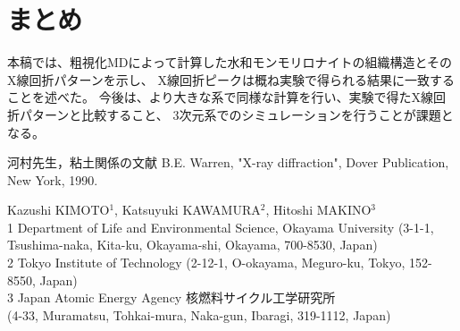 ﻿\documentclass[11pt,a4j]{jarticle}
\begin{document}
\section{まとめ}
本稿では、粗視化MDによって計算した水和モンモリロナイトの組織構造とそのX線回折パターンを示し、
X線回折ピークは概ね実験で得られる結果に一致することを述べた。
今後は、より大きな系で同様な計算を行い、実験で得たX線回折パターンと比較すること、
3次元系でのシミュレーションを行うことが課題となる。
\begin{thebibliography}{99}
	河村先生，粘土関係の文献
	B.E. Warren, "X-ray diffraction", Dover Publication, New York, 1990.
\end{thebibliography}
\vspace{5mm}
\begin{center}
Kazushi KIMOTO$^1$, Katsuyuki KAWAMURA$^2$, Hitoshi MAKINO$^3$\\
1 Department of Life and Environmental Science, Okayama University 
(3-1-1, Tsushima-naka, Kita-ku, Okayama-shi, Okayama, 700-8530, Japan)
\\
2 Tokyo Institute of Technology (2-12-1, O-okayama, Meguro-ku, Tokyo, 152-8550, Japan)\\
3 Japan Atomic Energy Agency 核燃料サイクル工学研究所\\
(4-33, Muramatsu, Tohkai-mura, Naka-gun, Ibaragi, 319-1112, Japan)
\end{center}
\end{document}
